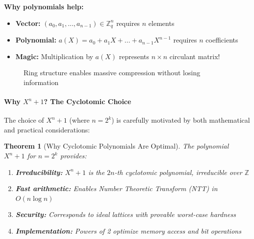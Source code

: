 \documentclass[11pt,a4paper]{article}
\newtheorem{theorem}{Theorem}
\begin{document}
\textbf{Why polynomials help:}
\begin{itemize}
    \item \textbf{Vector:} $(a_0, a_1, ..., a_{n-1}) \in \mathbb{Z}_q^n$ requires $n$ elements
    \item \textbf{Polynomial:} $a(X) = a_0 + a_1X + ... + a_{n-1}X^{n-1}$ requires $n$ coefficients
    \item \textbf{Magic:} Multiplication by $a(X)$ represents $n \times n$ circulant matrix!
\end{itemize}

\begin{figure}[h]
\centering
{}
\caption{Ring structure enables massive compression without losing information}
\end{figure}

\paragraph{Why $X^n + 1$? The Cyclotomic Choice}

The choice of $X^n + 1$ (where $n = 2^k$) is carefully motivated by both mathematical and practical considerations:

\begin{theorem}[Why Cyclotomic Polynomials Are Optimal]
The polynomial $X^n + 1$ for $n = 2^k$ provides:
\begin{enumerate}
    \item \textbf{Irreducibility:} $X^n + 1$ is the $2n$-th cyclotomic polynomial, irreducible over $\mathbb{Z}$
    \item \textbf{Fast arithmetic:} Enables Number Theoretic Transform (NTT) in $O(n \log n)$
    \item \textbf{Security:} Corresponds to ideal lattices with provable worst-case hardness
    \item \textbf{Implementation:} Powers of 2 optimize memory access and bit operations
\end{enumerate}
\end{theorem}
\end{document}

